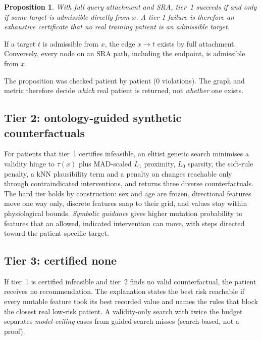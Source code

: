 \documentclass[conference]{IEEEtran}
\newtheorem{proposition}{Proposition}
\begin{document}
\begin{proposition}
With full query attachment and SRA, tier~1 succeeds if and only if some target is admissible directly from $x$. A tier-1 failure is therefore an exhaustive certificate that no real training patient is an admissible target.
\end{proposition}
\begin{IEEEproof}[Sketch]
If a target $t$ is admissible from $x$, the edge $x\to t$ exists by full attachment. Conversely, every node on an SRA path, including the endpoint, is admissible from $x$.
\end{IEEEproof}
The proposition was checked patient by patient (0 violations). The graph and metric therefore decide \emph{which} real patient is returned, not \emph{whether} one exists.

\subsection{Tier 2: ontology-guided synthetic counterfactuals}
For patients that tier~1 certifies infeasible, an elitist genetic search minimises a validity hinge to $\tau(x)$ plus MAD-scaled $L_1$ proximity, $L_0$ sparsity, the soft-rule penalty, a kNN plausibility term and a penalty on changes reachable only through contraindicated interventions, and returns three diverse counterfactuals. The hard tier holds by construction: sex and age are frozen, directional features move one way only, discrete features snap to their grid, and values stay within physiological bounds. \emph{Symbolic guidance} gives higher mutation probability to features that an allowed, indicated intervention can move, with steps directed toward the patient-specific target.

\subsection{Tier 3: certified none}
If tier~1 is certified infeasible and tier~2 finds no valid counterfactual, the patient receives no recommendation. The explanation states the best risk reachable if every mutable feature took its best recorded value and names the rules that block the closest real low-risk patient. A validity-only search with twice the budget separates \emph{model-ceiling} cases from guided-search misses (search-based, not a proof).
\end{document}
